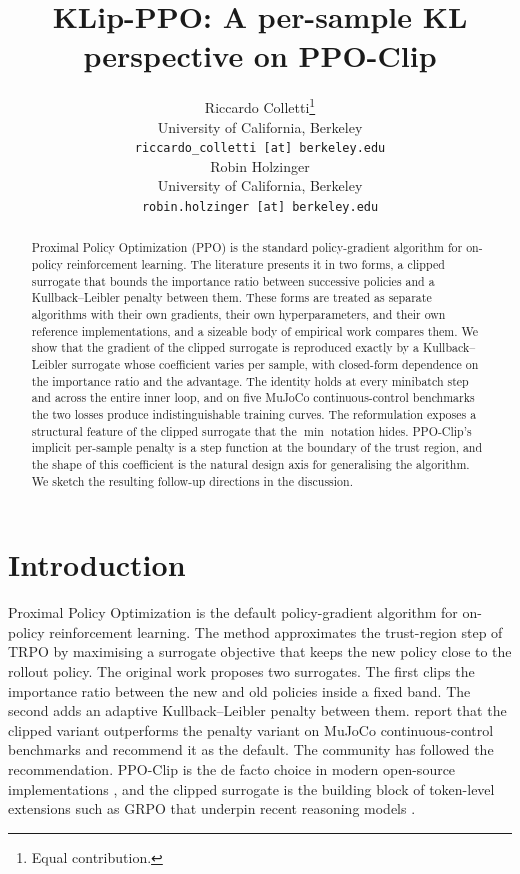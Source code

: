 \documentclass{article}
\title{KLip-PPO: A per-sample KL perspective on PPO-Clip}
\author{%
  Riccardo Colletti\thanks{Equal contribution.} \\
  University of California, Berkeley \\
  \texttt{riccardo\_colletti [at] berkeley.edu} \\
  \And
  Robin Holzinger\footnotemark[1] \\
  University of California, Berkeley \\
  \texttt{robin.holzinger [at] berkeley.edu}
}
\begin{document}
\maketitle
\begingroup
\renewcommand\thefootnote{}
\endgroup


\begin{abstract}
  Proximal Policy Optimization (PPO) is the standard policy-gradient
  algorithm for on-policy reinforcement learning. The literature
  presents it in two forms, a clipped surrogate that bounds the
  importance ratio between successive policies and a
  Kullback--Leibler penalty between them. These forms are treated as
  separate algorithms with their own gradients, their own
  hyperparameters, and their own reference implementations, and a
  sizeable body of empirical work compares them. We show that the
  gradient of the clipped surrogate is reproduced exactly by a
  Kullback--Leibler surrogate whose coefficient varies per sample,
  with closed-form dependence on the importance ratio and the
  advantage. The identity holds at every minibatch step and across
  the entire inner loop, and on five MuJoCo continuous-control
  benchmarks the two losses produce indistinguishable training
  curves. The reformulation exposes a structural feature of
  the clipped surrogate that the $\min$ notation hides. PPO-Clip's
  implicit per-sample penalty is a step function at the boundary of
  the trust region, and the shape of this coefficient is the natural
  design axis for generalising the algorithm. We sketch the
  resulting follow-up directions in the discussion.
\end{abstract}


\section{Introduction}
\label{sec:intro}

Proximal Policy Optimization \citep{schulman2017ppo} is the default
policy-gradient algorithm for on-policy reinforcement learning. The
method approximates the trust-region step of TRPO
\citep{schulman2015trpo, kakade2002approximately} by maximising a
surrogate objective that keeps the new policy close to the rollout
policy. The original work proposes two surrogates. The first clips
the importance ratio between the new and old policies inside a fixed
band. The second adds an adaptive Kullback--Leibler penalty between
them. \citet{schulman2017ppo} report that the clipped variant
outperforms the penalty variant on MuJoCo continuous-control
benchmarks and recommend it as the default. The community has
followed the recommendation. PPO-Clip is the de facto choice in
modern open-source implementations \citep{raffin2021sb3, huang2022cleanrl},
and the clipped surrogate is the building block of token-level
extensions such as GRPO \citep{shao2024deepseekmath} that underpin
recent reasoning models \citep{deepseekai2025r1}.
\end{document}

